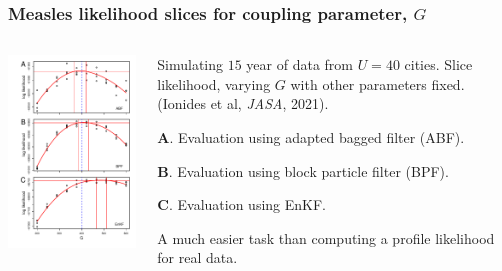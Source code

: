 \documentclass{beamer}
\begin{document}
\begin{frame}

\frametitle{Measles likelihood slices for coupling parameter, $G$}

\vspace{-5mm}

\begin{columns}[T] %
\begin{column}{.55\textwidth}
  \includegraphics[width=6cm]{slice_combined_plot-1.pdf}
\end{column}

\hspace{-5mm}
\begin{column}{.52\textwidth}

  \vspace{6mm}
  
  Simulating $15$ year of data from $U=40$ cities.
  Slice likelihood, varying $G$ with other parameters fixed.\\
   (Ionides et al, {\it JASA}, 2021).

  \vspace{3mm}

  {\bf A}. Evaluation using adapted bagged filter (ABF).

    \vspace{3mm}

  {\bf B}. Evaluation using block particle filter (BPF).

    \vspace{3mm}

  {\bf C}. Evaluation using EnKF.

  \vspace{3mm}
  A much easier task than computing a profile likelihood for real data.
 
  
\end{column}
\end{columns}

\end{frame}
\end{document}
